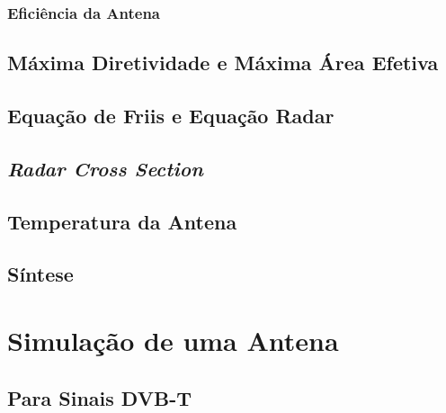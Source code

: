 \subsubsection*{Eficiência da Antena}


\subsection*{Máxima Diretividade e Máxima Área Efetiva}



\subsection*{Equação de Friis e Equação Radar}



\subsection*{\textit{Radar Cross Section}}



\subsection*{Temperatura da Antena}


\subsection*{Síntese}




\section{Simulação de uma Antena}


\subsection{Para Sinais DVB-T}

